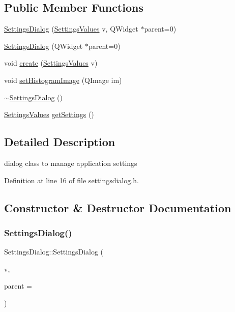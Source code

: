 \subsection*{Public Member Functions}
\begin{DoxyCompactItemize}
\item 
\hyperlink{class_settings_dialog_a76b0a61383133b8f723431c0b663bdc1}{Settings\+Dialog} (\hyperlink{struct_settings_values}{Settings\+Values} v, Q\+Widget $\ast$parent=0)
\item 
\hyperlink{class_settings_dialog_a9933956b777b2c0451e9119581cc22fb}{Settings\+Dialog} (Q\+Widget $\ast$parent=0)
\item 
void \hyperlink{class_settings_dialog_ae84085e9bcbf5411d75f7463b874e005}{create} (\hyperlink{struct_settings_values}{Settings\+Values} v)
\item 
void \hyperlink{class_settings_dialog_a3a730a1d975d4c349fe2a4ed01267735}{set\+Histogram\+Image} (Q\+Image im)
\item 
\hyperlink{class_settings_dialog_ac48f54d4472902be0a3845a69167f068}{$\sim$\+Settings\+Dialog} ()
\item 
\hyperlink{struct_settings_values}{Settings\+Values} \hyperlink{class_settings_dialog_aa60a210ac0141f29ba2f0ef0ebe5f191}{get\+Settings} ()
\end{DoxyCompactItemize}


\subsection{Detailed Description}
dialog class to manage application settings 

Definition at line 16 of file settingsdialog.\+h.



\subsection{Constructor \& Destructor Documentation}
\mbox{\label{class_settings_dialog_a76b0a61383133b8f723431c0b663bdc1}} 
\subsubsection{\texorpdfstring{Settings\+Dialog()}{SettingsDialog()}\hspace{0.1cm}{\footnotesize\ttfamily [1/2]}}
{\footnotesize\ttfamily Settings\+Dialog\+::\+Settings\+Dialog (\begin{DoxyParamCaption}\item[{\hyperlink{struct_settings_values}{Settings\+Values}}]{v,  }\item[{Q\+Widget $\ast$}]{parent = {} }\end{DoxyParamCaption})\hspace{0.3cm}{\ttfamily [explicit]}}

